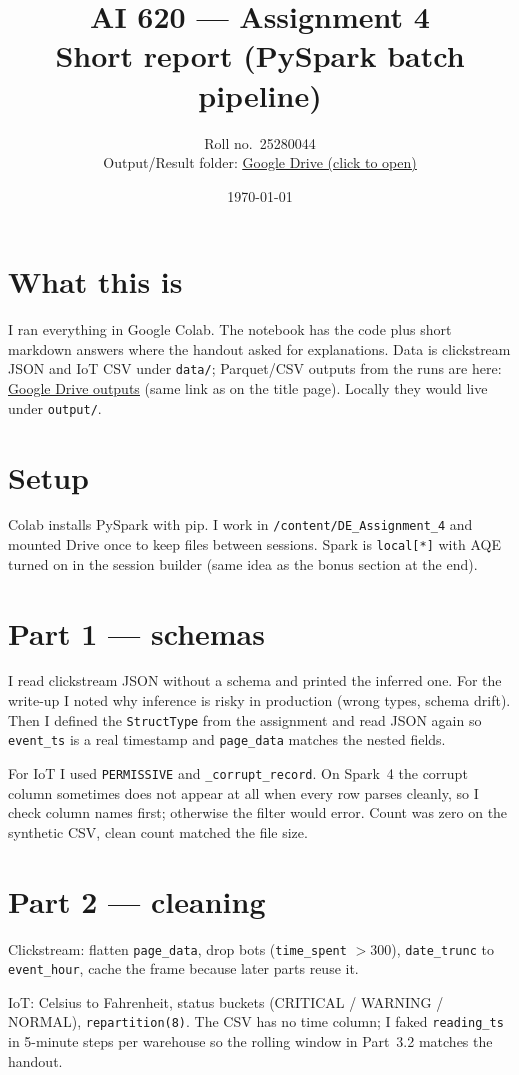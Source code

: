 \documentclass[11pt]{article}
\title{AI 620 --- Assignment 4\\Short report (PySpark batch pipeline)}
\author{Roll no.\ 25280044\\[0.6em]
\small Output/Result folder: \href{\outputfolderurl}{\underline{Google Drive (click to open)}}}
\date{\today}
\newcommand{\outputfolderurl}{https://drive.google.com/file/d/1AYIOAi2KbQZFTtyYwyYcQw4gm_CQTT_h/view?usp=sharing}
\begin{document}
\maketitle

\section*{What this is}
I ran everything in Google Colab. The notebook has the code plus short markdown answers where the handout asked for explanations. Data is clickstream JSON and IoT CSV under \texttt{data/}; Parquet/CSV outputs from the runs are here: \href{\outputfolderurl}{\underline{Google Drive outputs}} (same link as on the title page). Locally they would live under \texttt{output/}.

\section*{Setup}
Colab installs PySpark with pip. I work in \texttt{/content/DE\_Assignment\_4} and mounted Drive once to keep files between sessions. Spark is \texttt{local[*]} with AQE turned on in the session builder (same idea as the bonus section at the end).

\section*{Part 1 --- schemas}
I read clickstream JSON without a schema and printed the inferred one. For the write-up I noted why inference is risky in production (wrong types, schema drift). Then I defined the \texttt{StructType} from the assignment and read JSON again so \texttt{event\_ts} is a real timestamp and \texttt{page\_data} matches the nested fields.

For IoT I used \texttt{PERMISSIVE} and \texttt{\_corrupt\_record}. On Spark~4 the corrupt column sometimes does not appear at all when every row parses cleanly, so I check column names first; otherwise the filter would error. Count was zero on the synthetic CSV, clean count matched the file size.

\section*{Part 2 --- cleaning}
Clickstream: flatten \texttt{page\_data}, drop bots (\texttt{time\_spent} $>300$), \texttt{date\_trunc} to \texttt{event\_hour}, cache the frame because later parts reuse it.

IoT: Celsius to Fahrenheit, status buckets (CRITICAL / WARNING / NORMAL), \texttt{repartition(8)}. The CSV has no time column; I faked \texttt{reading\_ts} in 5-minute steps per warehouse so the rolling window in Part~3.2 matches the handout.
\end{document}
